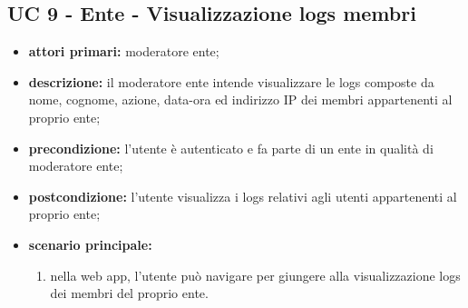 		\subsection{UC 9 - Ente - Visualizzazione logs membri}
		\begin{itemize}
			\item \textbf{attori primari:} moderatore ente;
			\item \textbf{descrizione:} il moderatore ente intende visualizzare le logs composte da nome, cognome, azione, data-ora ed indirizzo IP dei membri appartenenti al proprio ente;
			\item \textbf{precondizione:} l'utente è autenticato e fa parte di un ente in qualità di moderatore ente;
			\item \textbf{postcondizione:} l'utente visualizza i logs relativi agli utenti appartenenti al proprio ente;
			\item \textbf{scenario principale:}
			\begin{enumerate}
				\item nella web app, l'utente può navigare per giungere alla visualizzazione logs dei membri del proprio ente.
			\end{enumerate}
		\end{itemize}

